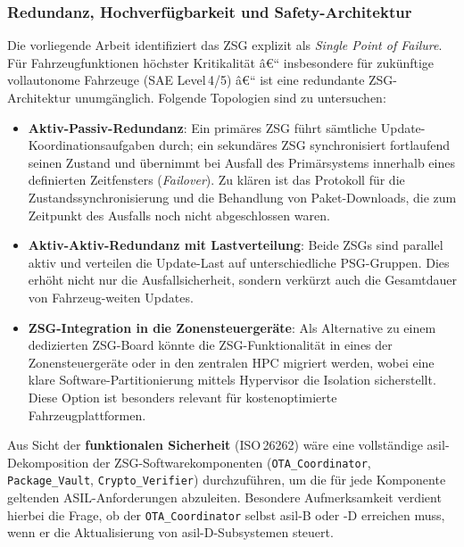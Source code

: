 ﻿\documentclass[12pt,a4paper,twoside]{article}
\begin{document}
\subsubsection{Redundanz, Hochverfügbarkeit und Safety-Architektur}

Die vorliegende Arbeit identifiziert das ZSG explizit als
\emph{Single Point of Failure}. Für Fahrzeugfunktionen höchster
Kritikalität â€“ insbesondere für zukünftige vollautonome Fahrzeuge
(SAE Level\,4/5) â€“ ist eine redundante ZSG-Architektur unumgänglich.
Folgende Topologien sind zu untersuchen:

\begin{itemize}
  \item \textbf{Aktiv-Passiv-Redundanz}: Ein primäres ZSG führt sämtliche
    Update-Koordina\-tions\-aufgaben durch; ein sekundäres ZSG synchronisiert
    fortlaufend seinen Zustand und übernimmt bei Ausfall des Primärsystems
    innerhalb eines definierten Zeitfensters (\textit{Failover}).
    Zu klären ist das Protokoll für die Zustandssynchronisierung und
    die Behandlung von Paket-Downloads, die zum Zeitpunkt des Ausfalls
    noch nicht abgeschlossen waren.
  \item \textbf{Aktiv-Aktiv-Redundanz mit Lastverteilung}: Beide ZSGs
    sind parallel aktiv und verteilen die Update-Last auf unterschiedliche
    PSG-Gruppen. Dies erhöht nicht nur die Ausfallsicherheit, sondern
    verkürzt auch die Gesamtdauer von Fahrzeug-weiten Updates.
  \item \textbf{ZSG-Integration in die Zonensteuergeräte}: Als
    Alternative zu einem dedizierten ZSG-Board könnte die
    ZSG-Funktionalität in eines der Zonensteuergeräte oder in den
    zentralen HPC migriert werden, wobei eine klare
    Software-Partitionierung mittels Hypervisor die Isolation
    sicherstellt. Diese Option ist besonders relevant für
    kostenoptimierte Fahrzeugplattformen.
\end{itemize}

Aus Sicht der \textbf{funktionalen Sicherheit} (ISO\,26262) wäre eine
vollständige \gls{asil}-Dekomposition der ZSG-Softwarekomponenten
(\texttt{OTA\_Coordinator}, \texttt{Package\_Vault}, \texttt{Cryp\newline to\_Verifier}) durchzuführen, um die für jede Komponente
geltenden ASIL-Anforderungen abzuleiten. Besondere Aufmerksamkeit verdient
hierbei die Frage, ob der \texttt{OTA\_Coordinator} selbst
\gls{asil}-B oder -D erreichen muss, wenn er die Aktualisierung
von \gls{asil}-D-Subsystemen steuert.
\end{document}
